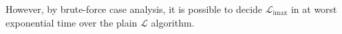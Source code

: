 \documentclass[11pt, twoside, reqno]{book}
\DeclareMathOperator{\imax}{imax}
\begin{document}
However, by brute-force case analysis, it is possible to decide $\mathcal{L}_{\imax}$ in at worst exponential time over the plain $\mathcal{L}$ algorithm.

\iffalse
\begin{appdices}

\chapter{I Like Appendices}

\section{A Lovely Appendix}

\end{appdices}


\begin{bibliog}

\end{bibliog}
\fi
\end{document}
